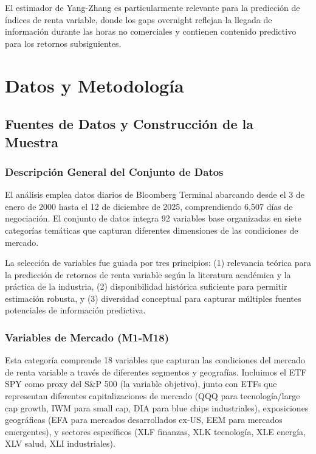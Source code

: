 \documentclass[11pt,a4paper]{article}
\begin{document}
El estimador de Yang-Zhang es particularmente relevante para la predicción de índices de renta variable, donde los gaps overnight reflejan la llegada de información durante las horas no comerciales y contienen contenido predictivo para los retornos subsiguientes.

\section{Datos y Metodología}

\subsection{Fuentes de Datos y Construcción de la Muestra}

\subsubsection{Descripción General del Conjunto de Datos}

El análisis emplea datos diarios de Bloomberg Terminal abarcando desde el 3 de enero de 2000 hasta el 12 de diciembre de 2025, comprendiendo 6,507 días de negociación. El conjunto de datos integra 92 variables base organizadas en siete categorías temáticas que capturan diferentes dimensiones de las condiciones de mercado.

La selección de variables fue guiada por tres principios: (1) relevancia teórica para la predicción de retornos de renta variable según la literatura académica y la práctica de la industria, (2) disponibilidad histórica suficiente para permitir estimación robusta, y (3) diversidad conceptual para capturar múltiples fuentes potenciales de información predictiva.

\subsubsection{Variables de Mercado (M1-M18)}

Esta categoría comprende 18 variables que capturan las condiciones del mercado de renta variable a través de diferentes segmentos y geografías. Incluimos el ETF SPY como proxy del S\&P 500 (la variable objetivo), junto con ETFs que representan diferentes capitalizaciones de mercado (QQQ para tecnología/large cap growth, IWM para small cap, DIA para blue chips industriales), exposiciones geográficas (EFA para mercados desarrollados ex-US, EEM para mercados emergentes), y sectores específicos (XLF finanzas, XLK tecnología, XLE energía, XLV salud, XLI industriales).
\end{document}
